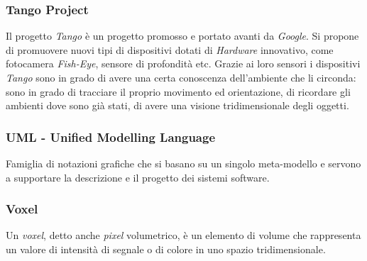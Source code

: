 \subsubsection{Tango Project}
Il progetto \emph{Tango} è un progetto promosso e portato avanti da \emph{Google}. Si propone di promuovere nuovi tipi di dispositivi dotati di \emph{Hardware} innovativo, come fotocamera \emph{Fish-Eye}, sensore di profondità etc. Grazie ai loro sensori i dispositivi \emph{Tango} sono in grado di avere una certa conoscenza dell'ambiente che li circonda: sono in grado di tracciare il proprio movimento ed orientazione, di ricordare gli ambienti dove sono già stati, di avere una visione tridimensionale degli oggetti.

\subsubsection{UML - Unified Modelling Language}
Famiglia di notazioni grafiche che si basano su un singolo meta-modello e servono a
supportare la descrizione e il progetto dei sistemi software.

\subsubsection{Voxel}
Un \emph{voxel}, detto anche \emph{pixel} volumetrico, è un elemento di volume che rappresenta un valore di intensità di segnale o di colore in uno spazio tridimensionale.






